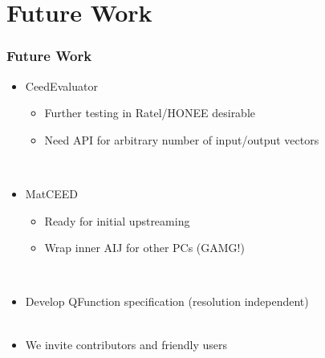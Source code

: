 \documentclass{beamer}
\begin{document}
\section{Future Work}

\begin{frame}
\begin{center}
\frametitle{Future Work}

\begin{itemize}

\item CeedEvaluator\\

\begin{itemize}

\item Further testing in Ratel/HONEE desirable

\item Need API for arbitrary number of input/output vectors

\end{itemize}

~\\

\item MatCEED\\

\begin{itemize}

\item Ready for initial upstreaming

\item Wrap inner AIJ for other PCs (GAMG!)

\end{itemize}

~\\

\item Develop QFunction specification (resolution independent)\\

~\\

\item We invite contributors and friendly users\\

\end{itemize}

\end{center}
\end{frame}
\end{document}
